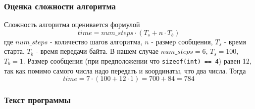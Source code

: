 \subsubsection*{Оценка сложности алгоритма}
Сложность алгоритма оценивается формулой
$$
time = num\_steps \cdot \left( T_s + n \cdot T_b \right)
$$
где $num\_steps$ - количество шагов алгоритма, $n$ - размер сообщения, $T_s$ - время старта, $T_b$ - время передачи байта. В нашем случае $num\_steps = 6$, $T_s = 100$, $T_b = 1$. Размер сообщения (при предположении что \texttt{sizeof(int) == 4}) равен 12, так как помимо самого числа надо передать и координаты, что два числа. Тогда
$$
time = 7 \cdot \left( 100 + 12 \cdot 1 \right) = 700 + 84 = 784
$$

\subsubsection*{Текст программы}
\inputminted[breakanywhere=true,
             breaklines=true]{c}{../task-1/main.c}